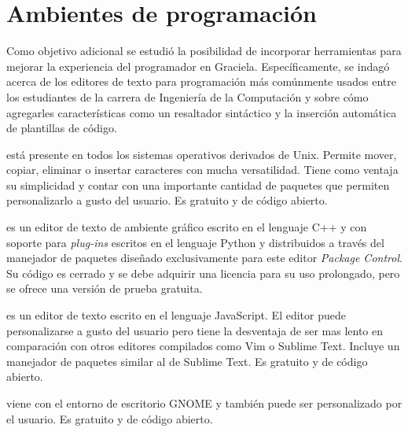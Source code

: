 \section{Ambientes de programación}

Como objetivo adicional se estudió la posibilidad de incorporar herramientas
para mejorar la experiencia del programador en Graciela. Específicamente, se
indagó acerca de los editores de texto para programación más comúnmente usados
entre los estudiantes de la carrera de Ingeniería de la Computación y sobre cómo
agregarles características como un resaltador sintáctico y la inserción
automática de plantillas de código.

\begin{description}[leftmargin=!,labelwidth=\widthof{\bfseries Sublime Text}]

  \item [Vi / Vim] está presente en todos los sistemas operativos derivados de
  Unix. Permite mover, copiar, eliminar o insertar caracteres con mucha
  versatilidad. Tiene como ventaja su simplicidad y contar con una importante
  cantidad de paquetes que permiten personalizarlo a gusto del usuario. Es
  gratuito y de código abierto.

  \item [Sublime Text] es un editor de texto de ambiente gráfico escrito en el
  lenguaje C++ y con soporte para \textit{plug-ins} escritos en el lenguaje
  Python y distribuidos a través del manejador de paquetes diseñado
  exclusivamente para este editor \textit{Package Control}. Su código es cerrado
  y se debe adquirir una licencia para su uso prolongado, pero se ofrece una
  versión de prueba gratuita.

  \item [Atom] es un editor de texto escrito en el lenguaje JavaScript. El
  editor puede personalizarse a gusto del usuario pero tiene la desventaja de
  ser mas lento en comparación con otros editores compilados como Vim o Sublime
  Text. Incluye un manejador de paquetes similar al de Sublime Text. Es gratuito
  y de código abierto.

  \item [Gedit] viene con el entorno de escritorio GNOME y también puede ser
  personalizado por el usuario. Es gratuito y de código abierto.

\end{description}


